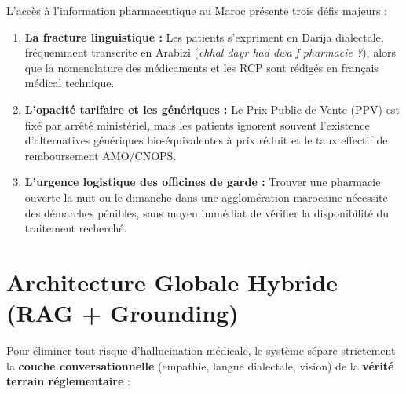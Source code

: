 \documentclass[a4paper,10pt]{article}
\begin{document}
L'accès à l'information pharmaceutique au Maroc présente trois défis majeurs :
\begin{enumerate}[leftmargin=*]
    \item \textbf{La fracture linguistique :} Les patients s'expriment en Darija dialectale, fréquemment transcrite en Arabizi (\textit{chhal dayr had dwa f pharmacie ?}), alors que la nomenclature des médicaments et les RCP sont rédigés en français médical technique.
    \item \textbf{L'opacité tarifaire et les génériques :} Le Prix Public de Vente (PPV) est fixé par arrêté ministériel, mais les patients ignorent souvent l'existence d'alternatives génériques bio-équivalentes à prix réduit et le taux effectif de remboursement AMO/CNOPS.
    \item \textbf{L'urgence logistique des officines de garde :} Trouver une pharmacie ouverte la nuit ou le dimanche dans une agglomération marocaine nécessite des démarches pénibles, sans moyen immédiat de vérifier la disponibilité du traitement recherché.
\end{enumerate}

\section{Architecture Globale Hybride (RAG + Grounding)}

Pour éliminer tout risque d'hallucination médicale, le système sépare strictement la \textbf{couche conversationnelle} (empathie, langue dialectale, vision) de la \textbf{vérité terrain réglementaire} :
\end{document}
